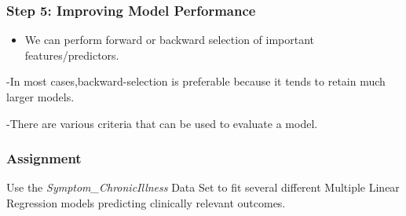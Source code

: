 \documentclass[
]{article}
\providecommand{\tightlist}{%
  \setlength{\itemsep}{0pt}\setlength{\parskip}{0pt}}
\begin{document}
\hypertarget{step-5-improving-model-performance}{%
\subsubsection{Step 5: Improving Model
Performance}\label{step-5-improving-model-performance}}

\begin{itemize}
\tightlist
\item
  We can perform forward or backward selection of important
  features/predictors.
\end{itemize}

-In most cases,backward-selection is preferable because it tends to
retain much larger models.

-There are various criteria that can be used to evaluate a model.

\hypertarget{assignment}{%
\subsubsection{Assignment}\label{assignment}}

Use the \emph{Symptom\_ChronicIllness} Data Set to fit several different
Multiple Linear Regression models predicting clinically relevant
outcomes.
\end{document}
